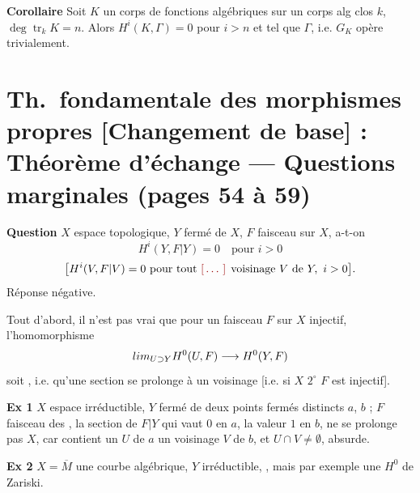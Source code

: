 \documentclass[11pt,a4paper]{article}
\begin{document}
\textbf{Corollaire} Soit $K$ un \struck{\ill{}} corps de fonctions
algébriques sur un corps alg clos $k$,
$\deg\operatorname{tr}_{k} K = n$. Alors $H^{i}(K,\Gamma) = 0$ pour
$i > n$ et  tel que \ill{} $\Gamma$, i.e. $G_{K}$ opère
trivialement.

\section*{Th.\ fondamentale des morphismes propres [Changement de base] : Théorème d'échange --- Questions marginales (pages 54 à 59)}


\textbf{Question} $X$ espace topologique, $Y$ fermé de $X$, $F$ faisceau
 sur $X$, a-t-on
\[
H^{i}(Y, F|Y) = 0 \quad \text{pour } i > 0
\]
\[
\bigl[H^{i}(V, F|V) = 0 \ \text{pour tout \ill{} voisinage } V
\text{ de } Y,\ i > 0\bigr].
\]
Réponse négative.

Tout d'abord, il n'est pas vrai que pour un faisceau $F$ sur $X$ injectif,
l'homomorphisme
\[
\varinjlim_{U \supset Y} H^{0}(U,F) \longrightarrow H^{0}(Y,F)
\]
soit , i.e. qu'une section \ill{} se prolonge à un
voisinage [i.e. si $X$ \ill{} $2^{\circ}$ $F$ est \ill{} injectif].

\textbf{Ex 1} $X$ espace irréductible, $Y$ fermé de \ill{} deux points
fermés distincts $a$, $b$ ; $F$ faisceau des \ill{}, la section de $F|Y$
qui vaut $0$ en $a$, la valeur $1$ en $b$, ne se prolonge pas
 \ill{} $X$, car \ill{} contient un $U$ de $a$
\ill{} un voisinage $V$ de $b$, et $U \cap V \ne \emptyset$, absurde.

\textbf{Ex 2} $X = \overline{M}$ \ill{} une courbe algébrique, $Y$ \ill{}
irréductible, \add{\ill{}} \struck{\ill{}}, mais \ill{} par exemple une
\ill{} $H^{0}$ \ill{} de Zariski.

\end{document}
